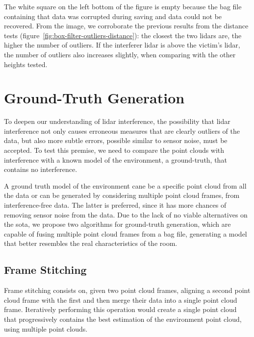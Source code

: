 The white square on the left bottom of the figure is empty because the bag file containing that data was corrupted during saving and data could not be recovered. From the image, we corroborate the previous results from the distance tests (figure~\ref{fig:box-filter-outliers-distance}): the closest the two \acp{lidar} are, the higher the number of outliers. If the interferer \ac{lidar} is above the victim's \ac{lidar}, the number of outliers also increases slightly, when comparing with the other heights tested.





\section{Ground-Truth Generation}
\label{sec:lidar-interference:ground-truth-generation}
To deepen our understanding of \ac{lidar} interference, the possibility that \ac{lidar} interference not only causes erroneous measures that are clearly outliers of the data, but also more subtle errors, possible similar to sensor noise, must be accepted. To test this premise, we need to compare the point clouds with interference with a known model of the environment, a ground-truth, that contains no interference.  

A ground truth model of the environment cane be a specific point cloud from all the data or can be generated by considering multiple point cloud frames, from interference-free data. The latter is preferred, since it has more chances of removing sensor noise from the data. Due to the lack of no viable alternatives on the \acl{sota}, we propose two algorithms for ground-truth generation, which are capable of fusing multiple point cloud frames from a bag file, generating a model that better resembles the real characteristics of the room.


\subsection{Frame Stitching}
\label{subsec:lidar-interference:frame-stitching}
Frame stitching consists on, given two point cloud frames, aligning a second point cloud frame with the first and then merge their data into a single point cloud frame. Iteratively performing this operation would create a single point cloud that progressively contains the best estimation of the environment point cloud, using multiple point clouds.

